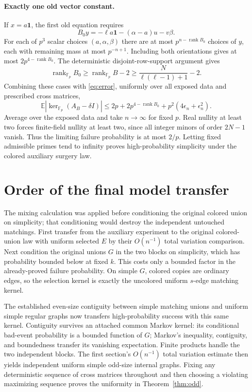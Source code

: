 \documentclass[11pt]{article}
\newcommand{\Fp}{\mathbb F_p}
\newcommand{\one}{\mathbf1}
\newcommand{\E}{\mathbb E}
\newcommand{\rank}{\operatorname{rank}}
\begin{document}
\paragraph{Exactly one old vector constant.}
If $x=a\one$, the first old equation requires
\[
 B_0y=-\ell a\one-(\alpha-a)u-v\beta.
\]
For each of $p^3$ scalar choices $(a,\alpha,\beta)$ there are at most $p^{n-\rank B_0}$ choices of $y$, each with remaining mass at most $p^{-n+1}$. Including both orientations gives at most $2p^{4-\rank B_0}$. The deterministic disjoint-row-support argument gives
\[
 \rank_{\Fp}B_0\ge\rank_{\Fp}B-2
 \ge\frac{N}{\ell(\ell-1)+1}-2.
\]
Combining these cases with \eqref{eq:error}, uniformly over all exposed data and prescribed cross matrices,
\begin{equation}\label{eq:finalmoment}
 \E|\ker_{\Fp}(A_B-\delta I)|
 \le2p+2p^{4-\rank B_0}+p^2(4\epsilon_n+\epsilon_n^2).
\end{equation}
Average over the exposed data and take $n\to\infty$ for fixed $p$. Real nullity at least two forces finite-field nullity at least two, since all integer minors of order $2N-1$ vanish. Thus the limiting failure probability is at most $2/p$. Letting fixed admissible primes tend to infinity proves high-probability simplicity under the colored auxiliary surgery law.

\section{Order of the final model transfer}
The mixing calculation was applied before conditioning the original colored union on simplicity; that conditioning would destroy the independent untouched matchings. First transfer from the auxiliary experiment to the original colored-union law with uniform selected $E$ by their $O(n^{-1})$ total variation comparison. Next condition the original unions $G$ in the two blocks on simplicity, which has probability bounded below at fixed $k$. This costs only a bounded factor in the already-proved failure probability. On simple $G$, colored copies are ordinary edges, so the selection kernel is exactly the uncolored uniform $s$-edge matching kernel.

The established even-size contiguity between simple matching unions and uniform simple regular graphs \cite[Theorem 3]{mrrw} now transfers high-probability success with this same kernel. Contiguity survives an attached common Markov kernel: its conditional bad-event probability is a bounded function of $G$; Markov's inequality, contiguity, and boundedness transfer its vanishing expectation. Finite products handle the two independent blocks. The first section's $O(n^{-1})$ total variation estimate then yields independent uniform simple odd-size internal graphs. Fixing any deterministic sequence of cross matrices throughout and then choosing a violating maximizing sequence proves the uniformity in Theorem~\ref{thm:odd}.
\end{document}
